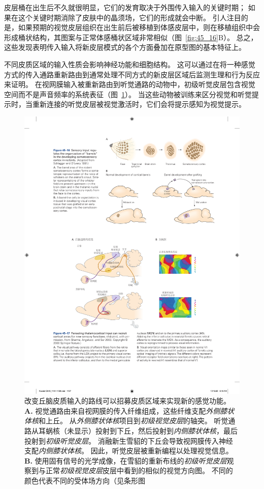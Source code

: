 皮层桶在出生后不久就很明显，它们的发育取决于外围传入输入的关键时期；
如果在这个关键时期消除了皮肤中的晶须场，它们的形成就会中断。
引人注目的是，如果预期的视觉皮层组织在出生前后被移植到体感皮层中，则在移植组织中会形成桶状结构，其图案与正常体感桶状区域非常相似（图~\ref{fig:45_16}B）。
总之，这些发现表明传入输入将新皮层模式的各个方面叠加在原型图的基本特征上。


不同皮质区域的输入性质会影响神经功能和细胞结构。
这可以通过在将一种感觉方式的传入通路重新路由到通常处理不同方式的新皮层区域后监测生理和行为反应来证明。
在视网膜输入被重新路由到听觉通路的动物中，初级听觉皮层包含视觉空间而不是声音频率的系统表征（图~\ref{fig:45_17}）。
当这些动物被训练来区分视觉和听觉提示时，当重新连接的听觉皮层被视觉激活时，它们会将提示感知为视觉提示。


\begin{figure}[htbp]
	\centering
	\includegraphics[width=0.9\linewidth]{chap45/fig_45_17}
	\caption{改变丘脑皮质输入的路线可以招募皮质区域来实现新的感觉功能\cite{sharma2000induction}。
		\textbf{A.} 视觉通路由来自视网膜的传入纤维组成，这些纤维支配\textit{外侧膝状体核}和上丘。
		从\textit{外侧膝状体核}项目到\textit{初级视觉皮层}的轴突。
		听觉通路从耳蜗核（未显示）投射到下丘，然后投射到\textit{内侧膝状体核}，最后投射到\textit{初级听觉皮层}。
		消融新生雪貂的下丘会导致视网膜传入神经支配\textit{内侧膝状体核}。
		因此，听觉皮层被重新编程以处理视觉信息。
		\textbf{B.} 使用固有信号的光学成像，在雪貂的重新布线的\textit{初级听觉皮层}观察到与正常\textit{初级视觉皮层}皮层中看到的相似的视觉方向图。
		不同的颜色代表不同的受体场方向（见条形图}
	\label{fig:45_17}
\end{figure}


